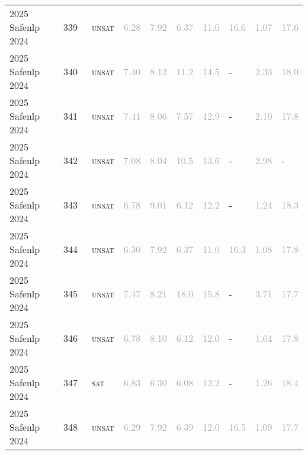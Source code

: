 \begin{center}
{\begin{longtable}{@{}llllllllll@{}}
2025 Safenlp 2024 & 339 & ~\textsc{unsat} & \textcolor{darkgray}{6.28} & \textcolor{darkgray}{7.92} & \textcolor{darkgray}{6.37} & \textcolor{darkgray}{11.0} & \textcolor{darkgray}{16.6} & \textcolor{darkgray}{1.07} & \textcolor{darkgray}{17.6} \\
2025 Safenlp 2024 & 340 & ~\textsc{unsat} & \textcolor{darkgray}{7.40} & \textcolor{darkgray}{8.12} & \textcolor{darkgray}{11.2} & \textcolor{darkgray}{14.5} & - & \textcolor{darkgray}{2.33} & \textcolor{darkgray}{18.0} \\
2025 Safenlp 2024 & 341 & ~\textsc{unsat} & \textcolor{darkgray}{7.41} & \textcolor{darkgray}{8.06} & \textcolor{darkgray}{7.57} & \textcolor{darkgray}{12.9} & - & \textcolor{darkgray}{2.10} & \textcolor{darkgray}{17.8} \\
2025 Safenlp 2024 & 342 & ~\textsc{unsat} & \textcolor{darkgray}{7.08} & \textcolor{darkgray}{8.04} & \textcolor{darkgray}{10.5} & \textcolor{darkgray}{13.6} & - & \textcolor{darkgray}{2.98} & - \\
2025 Safenlp 2024 & 343 & ~\textsc{unsat} & \textcolor{darkgray}{6.78} & \textcolor{darkgray}{9.01} & \textcolor{darkgray}{6.12} & \textcolor{darkgray}{12.2} & - & \textcolor{darkgray}{1.24} & \textcolor{darkgray}{18.3} \\
2025 Safenlp 2024 & 344 & ~\textsc{unsat} & \textcolor{darkgray}{6.30} & \textcolor{darkgray}{7.92} & \textcolor{darkgray}{6.37} & \textcolor{darkgray}{11.0} & \textcolor{darkgray}{16.3} & \textcolor{darkgray}{1.08} & \textcolor{darkgray}{17.8} \\
2025 Safenlp 2024 & 345 & ~\textsc{unsat} & \textcolor{darkgray}{7.47} & \textcolor{darkgray}{8.21} & \textcolor{darkgray}{18.0} & \textcolor{darkgray}{15.8} & - & \textcolor{darkgray}{3.71} & \textcolor{darkgray}{17.7} \\
2025 Safenlp 2024 & 346 & ~\textsc{unsat} & \textcolor{darkgray}{6.78} & \textcolor{darkgray}{8.10} & \textcolor{darkgray}{6.12} & \textcolor{darkgray}{12.0} & - & \textcolor{darkgray}{1.64} & \textcolor{darkgray}{17.8} \\
2025 Safenlp 2024 & 347 & ~\textsc{sat} & \textcolor{darkgray}{6.83} & \textcolor{darkgray}{6.30} & \textcolor{darkgray}{6.08} & \textcolor{darkgray}{12.2} & - & \textcolor{darkgray}{1.26} & \textcolor{darkgray}{18.4} \\
2025 Safenlp 2024 & 348 & ~\textsc{unsat} & \textcolor{darkgray}{6.29} & \textcolor{darkgray}{7.92} & \textcolor{darkgray}{6.39} & \textcolor{darkgray}{12.0} & \textcolor{darkgray}{16.5} & \textcolor{darkgray}{1.09} & \textcolor{darkgray}{17.7} \\

\end{longtable}}
\end{center}
